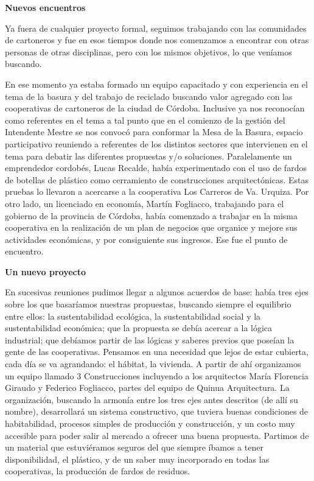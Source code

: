 \begin{fullwidth}
\textbf{Nuevos encuentros}

Ya fuera de cualquier proyecto formal, seguimos trabajando con las
comunidades de cartoneros y fue en esos tiempos donde nos comenzamos a
encontrar con otras personas de otras disciplinas, pero con los mismos
objetivos, lo que veníamos buscando.

En ese momento ya estaba formado un equipo capacitado y con experiencia
en el tema de la basura y del trabajo de reciclado buscando valor
agregado con las cooperativas de cartoneros de la ciudad de Córdoba.
Inclusive ya nos reconocían como referentes en el tema a tal punto que
en el comienzo de la gestión del Intendente Mestre se nos convocó para
conformar la Mesa de la Basura, espacio participativo reuniendo a
referentes de los distintos sectores que intervienen en el tema para
debatir las diferentes propuestas y/o soluciones. Paralelamente un
emprendedor cordobés, Lucas Recalde, había experimentado con el uso de
fardos de botellas de plástico como cerramiento de construcciones
arquitectónicas. Estas pruebas lo llevaron a acercarse a la cooperativa
Los Carreros de Va. Urquiza. Por otro lado, un licenciado en economía,
Martín Fogliacco, trabajando para el gobierno de la provincia de
Córdoba, había comenzado a trabajar en la misma cooperativa en la
realización de un plan de negocios que organice y mejore sus actividades
económicas, y por consiguiente sus ingresos. Ese fue el punto de
encuentro.

\textbf{Un nuevo proyecto}

En sucesivas reuniones pudimos llegar a algunos acuerdos de base: había
tres ejes sobre los que basaríamos nuestras propuestas, buscando siempre
el equilibrio entre ellos: la sustentabilidad ecológica, la
sustentabilidad social y la sustentabilidad económica; que la propuesta
se debía acercar a la lógica industrial; que debíamos partir de las
lógicas y saberes previos que poseían la gente de las cooperativas.
Pensamos en una necesidad que lejos de estar cubierta, cada día se va
agrandando: el hábitat, la vivienda. A partir de ahí organizamos un
equipo llamado 3 Construcciones incluyendo a los arquitectos María
Florencia Giraudo y Federico Fogliacco, partes del equipo de Quinua
Arquitectura. La organización, buscando la armonía entre los tres ejes
antes descritos (de allí su nombre), desarrollará un sistema
constructivo, que tuviera buenas condiciones de habitabilidad, procesos
simples de producción y construcción, y un costo muy accesible para
poder salir al mercado a ofrecer una buena propuesta. Partimos de un
material que estuviéramos seguros del que siempre íbamos a tener
disponibilidad, el plástico, y de un saber muy incorporado en todas las
cooperativas, la producción de fardos de residuos.


\end{fullwidth}
